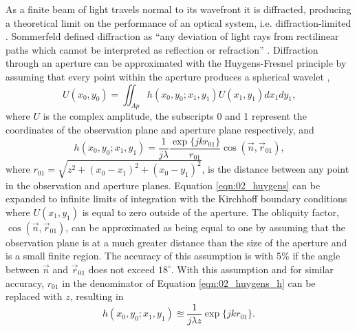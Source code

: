 As a finite beam of light travels normal to its wavefront it is diffracted, producing a theoretical limit on the performance of an optical system, i.e. diffraction-limited \cite{Born-1965-HHGYgjdH}.
Sommerfeld defined diffraction as ``any deviation of light rays from rectilinear paths which cannot be interpreted as reflection or refraction'' \cite{Sommerfeld-1954-ep2AWrFF}.
Diffraction through an aperture can be approximated with the Huygens-Fresnel principle by assuming that every point within the aperture produces a spherical wavelet \cite{Huygens-1690-gD8nxCn8},
\begin{equation}
  U(x_0,y_0) = \iint_{Ap} h(x_0,y_0;x_1,y_1)U(x_1,y_1)dx_1dy_1 \textrm{,}
  \label{eqn:02_huygens}
\end{equation}
where $U$ is the complex amplitude, the subscripts 0 and 1 represent the coordinates of the observation plane and aperture plane respectively, and
\begin{equation}
  h(x_0,y_0;x_1,y_1) = \frac{1}{j\lambda}\frac{\exp\{jkr_{01}\}}{r_{01}}\cos(\overrightarrow{n},\overrightarrow{r}_{01}) \textrm{,}
  \label{eqn:02_huygens_h}
\end{equation}
where $r_{01} = \sqrt{z^2+(x_0-x_1)^2+(x_0-y_1)^2}$, is the distance between any point in the observation and aperture planes.
Equation \ref{eqn:02_huygens} can be expanded to infinite limits of integration with the Kirchhoff boundary conditions where $U(x_1,y_1)$ is equal to zero outside of the aperture.
The obliquity factor, $\cos(\overrightarrow{n},\overrightarrow{r}_{01})$, can be approximated as being equal to one by assuming that the observation plane is at a much greater distance than the size of the aperture and is a small finite region.
The accuracy of this assumption is with 5\% if the angle between  $\overrightarrow{n}$ and $\overrightarrow{r}_{01}$ does not exceed $18^\circ$\cite{Goodman-1968-zPUmuuzx}.
With this assumption and for similar accuracy, $r_{01}$ in the denominator of Equation \ref{eqn:02_huygens_h} can be replaced with $z$, resulting in
\begin{equation}
  h(x_0,y_0;x_1,y_1) \approxeq \frac{1}{j\lambda z}\exp\{jkr_{01}\} \textrm{.}
\end{equation}

